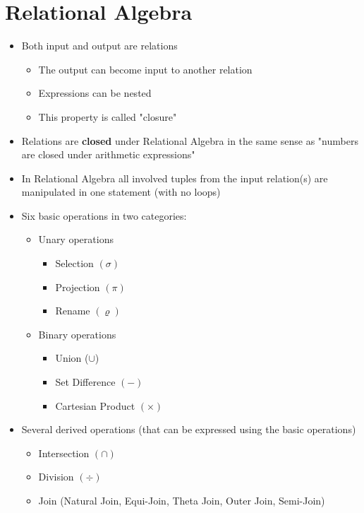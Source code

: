 \documentclass{article}[18pt]
\begin{document}
\section{Relational Algebra}
\begin{itemize}
	\item Both input and output are relations
	\begin{itemize}
		\item The output can become input to another relation
		\item Expressions can be nested
		\item This property is called "closure"
	\end{itemize}
	\item Relations are \textbf{closed} under Relational Algebra in the same sense as "numbers are closed under arithmetic expressions"
	\item In Relational Algebra all involved tuples from the input relation(s) are manipulated in one statement (with no loops)
\end{itemize}
\begin{itemize}
	\item Six basic operations in two categories:
	\begin{itemize}
		\item Unary operations
		\begin{itemize}
			\item Selection $(\sigma)$
			\item Projection $(\pi)$
			\item Rename $(\varrho)$
		\end{itemize}
		\item Binary operations
		\begin{itemize}
			\item Union ($\cup$)
			\item Set Difference $(-)$
			\item Cartesian Product $(\times)$
		\end{itemize}
	\end{itemize}
	\item Several derived operations (that can be expressed using the basic operations)
	\begin{itemize}
		\item Intersection $(\cap)$
		\item Division $(\div)$
		\item Join (Natural Join, Equi-Join, Theta Join, Outer Join, Semi-Join)
	\end{itemize}
\end{itemize}
\end{document}
